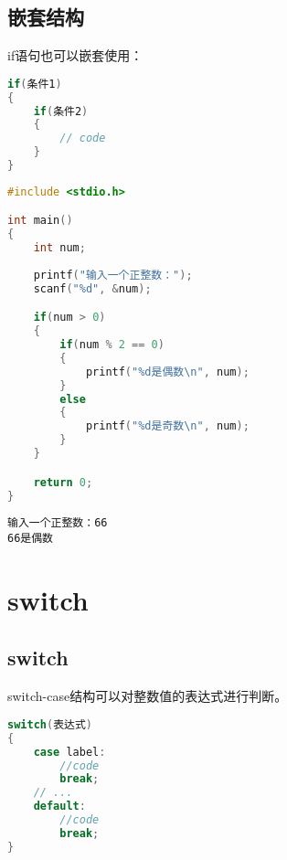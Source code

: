 \vspace{0.5cm}

\subsection{嵌套结构}

if语句也可以嵌套使用：

\vspace{-0.5cm}

\begin{lstlisting}[language=C]
if(条件1)
{
	if(条件2)
	{
		// code
	}
}
\end{lstlisting}

\vspace{0.5cm}


\begin{lstlisting}[language=C]
#include <stdio.h>

int main()
{
	int num;
	
	printf("输入一个正整数：");
	scanf("%d", &num);

	if(num > 0)
	{
		if(num % 2 == 0)
		{
			printf("%d是偶数\n", num);
		}
		else
		{
			printf("%d是奇数\n", num);
		}
	}

	return 0;
}
\end{lstlisting}

\begin{tcolorbox}
	\begin{verbatim}
输入一个正整数：66
66是偶数
	\end{verbatim}
\end{tcolorbox}

\newpage

\section{switch}

\subsection{switch}

switch-case结构可以对整数值的表达式进行判断。

\vspace{-0.5cm}

\begin{lstlisting}[language=C]
switch(表达式)
{
    case label:
        //code
        break;
    // ...
    default:
        //code
        break;
}
\end{lstlisting}

